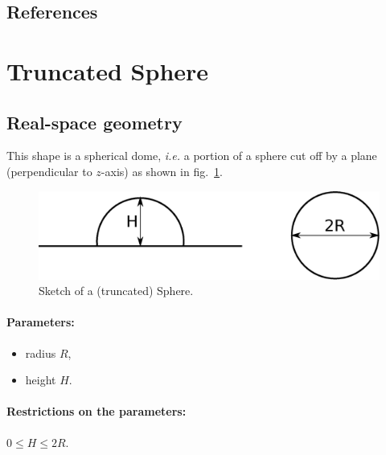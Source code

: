 \FloatBarrier

\subsection{References}

\newpage{\cleardoublepage}
\section{Truncated Sphere}
  
\subsection{Real-space geometry}
This shape is a spherical dome, \textit{i.e.} a portion of a sphere cut off by a plane (perpendicular
to $z$-axis) as shown in fig.~\ref{sphere}.
\begin{figure}[!h]
\begin{center}
\includegraphics[width=0.6\columnwidth]{Figures/sphere}
\caption{Sketch of a (truncated) Sphere.}
\end{center}
\label{sphere}
\end{figure} 

\FloatBarrier

\paragraph{Parameters:}
\begin{itemize}
\item radius $R$,
\item height $H$.
\end{itemize}

\paragraph{Restrictions on the parameters:} $0 \leq H\leq 2R$.

